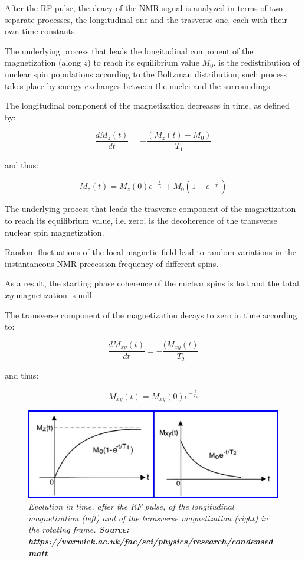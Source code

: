 \documentclass[12pt,openright,twoside,a4paper]{book}
\begin{document}
After the RF pulse, the deacy of the NMR signal is analyzed in terms of two separate processes, the longitudinal one and the trasverse one, each with their own time constants.

The underlying process that leads the longitudinal component of the magnetization (along $z$) to reach its equilibrium value $M_0$, is the redistribution of nuclear spin populations according to the Boltzman distribution; such process takes place by energy exchanges between the nuclei and the surroundings.

The longitudinal component of the magnetization decreases in time, as defined by:

\begin{equation}
\frac{dM_z(t)}{dt}=-\frac{(M_z(t)-M_0)}{T_1}
\end{equation}

and thus:

\begin{equation}
M_z(t)=M_z(0)e^{-\frac{t}{T_1}}+ M_0(1-e^{-\frac{t}{T_1}})
\end{equation}

The underlying process that leads the trasverse component of the magnetization to reach its equilibrium value, i.e. zero, is the decoherence of the transverse nuclear spin magnetization. 

Random  fluctuations of the local magnetic  field lead to random variations in the instantaneous NMR precession frequency of different spins. 

As a result, the starting phase coherence of the nuclear spins is lost and the total $xy$ magnetization is null. 

The transverse component of the magnetization decays to zero in time according to:

\begin{equation}
\frac{dM_{xy}(t)}{dt}=-\frac{(M_{xy}(t)}{T_2}
\end{equation}

and thus:

\begin{equation}
M_{xy}(t)=M_{xy}(0)e^{-\frac{t}{T_2}}
\end{equation}

\begin{figure}[!h]
\centering
\includegraphics[scale=0.5]{relaxation}
\caption{\textit{ Evolution in time, after the RF pulse, of the longitudinal magnetization (left) and of the transverse magnetization (right) in the rotating frame. \textbf{Source: https://warwick.ac.uk/fac/sci/physics/research/condensedmatt}}}
\label{relaxation}
\end{figure}
\end{document}
